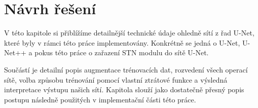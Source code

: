 \chapter{Návrh řešení}
\label{sec:Chapter4}
V této kapitole si přiblížíme detailnější technické údaje ohledně sítí z řad U-Net, které byly v rámci této práce implementovány. Konkrétně se jedná o U-Net, U-Net++ a pokus této práce o zařazení STN modulu do sítě U-Net.

Součástí je detailní popis augmentace trénovacích dat, rozvedení všech operací sítě, volba způsobu trénování pomocí vlastní ztrátové funkce a výsledná interpretace výstupu našich sítí. Kapitola slouží jako dostatečně přesný popis postupu následně použitých v implementační části této práce.
\endinput